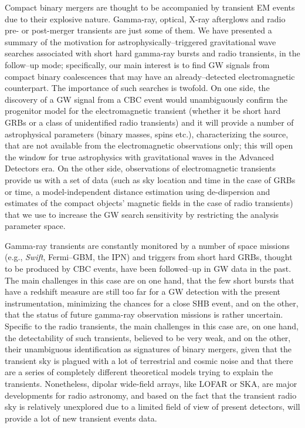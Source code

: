 Compact binary mergers are thought to be accompanied by transient EM events due to their explosive nature. Gamma-ray, optical, X-ray afterglows and radio pre- or post-merger transients are just some of them. We have presented a summary of the motivation for astrophysically--triggered gravitational wave searches associated with short hard gamma-ray bursts and radio transients, in the follow--up mode; specifically, our main interest is to find GW signals from compact binary coalescences that may have an already--detected electromagnetic counterpart. The importance of such searches is twofold. On one side, the discovery of a GW signal from a CBC event would unambiguously confirm the progenitor model for the electromagnetic transient (whether it be short hard GRBs or a class of unidentified radio transients) and it will provide a number of astrophysical parameters (binary masses, spins etc.), characterizing the source, that are not available from the electromagnetic observations only; this will open the window for true astrophysics with gravitational waves in the Advanced Detectors era. On the other side, observations of electromagnetic transients provide us with a set of data (such as sky location and time in the case of GRBs or time, a model-independent distance estimation using de-dispersion and estimates of the compact objects' magnetic fields in the case of radio transients) that we use to increase the GW search sensitivity by restricting the analysis parameter space.

Gamma-ray transients are constantly monitored by a number of space missions (e.g., \emph{Swift}, Fermi--GBM, the IPN) and triggers from short hard GRBs, thought to be produced by CBC events, have been followed--up in GW data in the past. The main challenges in this case are on one hand, that the few short bursts that have a redshift measure are still too far for a GW detection with the present instrumentation, minimizing the chances for a close SHB event, and on the other, that the status of future gamma-ray observation missions is rather uncertain. Specific to the radio transients, the main challenges in this case are, on one hand, the detectability of such transients, believed to be very weak, and on the other, their unambiguous identification as signatures of binary mergers, given that the transient sky is plagued with a lot of terrestrial and cosmic noise and that there are a series of completely different theoretical models trying to explain the transients. Nonetheless, dipolar wide-field arrays, like LOFAR or SKA, are major developments for radio astronomy, and based on the fact that the transient radio sky is relatively unexplored due to a limited field of view of present detectors, will provide a lot of new transient events data.

